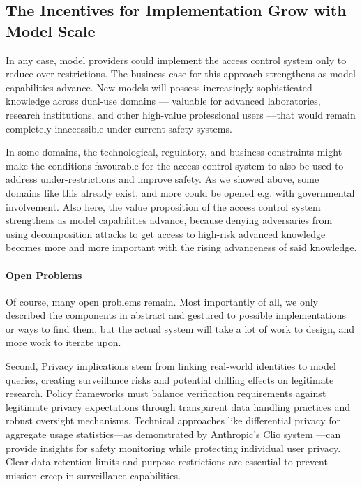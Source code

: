 \documentclass{article}
\theoremstyle{plain}
\theoremstyle{definition}
\theoremstyle{remark}
\begin{document}
\subsection{The Incentives for Implementation Grow with Model Scale}

In any case, model providers could implement the access control system only to reduce over-restrictions.
The business case for this approach strengthens as model capabilities advance.
New models will possess increasingly sophisticated knowledge across dual-use domains --- valuable for advanced laboratories, research institutions, and other high-value professional users ---that would remain completely inaccessible under current safety systems.

In some domains, the technological, regulatory, and business constraints might make the conditions favourable for the access control system to also be used to address under-restrictions and improve safety.
As we showed above, some domains like this already exist, and more could be opened e.g. with governmental involvement.
Also here, the value proposition of the access control system strengthens as model capabilities advance, because denying adversaries from using decomposition attacks to get access to high-risk advanced knowledge becomes more and more important with the rising advanceness of said knowledge.

\paragraph{Open Problems}

Of course, many open problems remain.
Most importantly of all, we only described the components in abstract and gestured to possible implementations or ways to find them, but the actual system will take a lot of work to design, and more work to iterate upon.

Second, Privacy implications stem from linking real-world identities to model queries, creating surveillance risks and potential chilling effects on legitimate research.
Policy frameworks must balance verification requirements against legitimate privacy expectations through transparent data handling practices and robust oversight mechanisms.
Technical approaches like differential privacy for aggregate usage statistics---as demonstrated by Anthropic's Clio system \cite{tamkin2024clioprivacypreservinginsightsrealworld}---can provide insights for safety monitoring while protecting individual user privacy.
Clear data retention limits and purpose restrictions are essential to prevent mission creep in surveillance capabilities.
\end{document}
